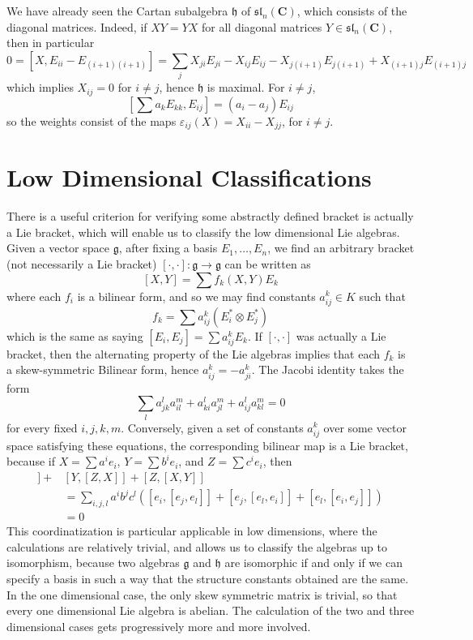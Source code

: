 We have already seen the Cartan subalgebra $\mathfrak{h}$ of $\mathfrak{sl}_n(\mathbf{C})$, which consists of the diagonal matrices. Indeed, if $XY = YX$ for all diagonal matrices $Y \in \mathfrak{sl}_n(\mathbf{C})$, then in particular
%
\[ 0 = [X,E_{ii} - E_{(i+1)(i+1)}] = \sum_j X_{ji} E_{ji} - X_{ij} E_{ij} - X_{j(i+1)} E_{j(i+1)} + X_{(i+1)j} E_{(i+1)j} \]
%
which implies $X_{ij} = 0$ for $i \neq j$, hence $\mathfrak{h}$ is maximal. For $i \neq j$,
%
\[ \left[\sum a_k E_{kk} ,E_{ij} \right] = (a_i - a_j) E_{ij} \]
%
so the weights consist of the maps $\varepsilon_{ij}(X) = X_{ii} - X_{jj}$, for $i \ne j$.















\section{Low Dimensional Classifications}

There is a useful criterion for verifying some abstractly defined bracket is actually a Lie bracket, which will enable us to classify the low dimensional Lie algebras. Given a vector space $\mathfrak{g}$, after fixing a basis $E_1, \dots, E_n$, we find an arbitrary bracket (not necessarily a Lie bracket) $[\cdot, \cdot]: \mathfrak{g} \to \mathfrak{g}$ can be written as
%
\[ [X,Y] = \sum f_k(X,Y) E_k \]
%
where each $f_i$ is a bilinear form, and so we may find constants $a_{ij}^k \in K$ such that
%
\[ f_k = \sum a^k_{ij} ( E_i^* \otimes E_j^* ) \]
%
which is the same as saying $[E_i, E_j] = \sum a_{ij}^k E_k$. If $[\cdot, \cdot]$ was actually a Lie bracket, then the alternating property of the Lie algebras implies that each $f_k$ is a skew-symmetric Bilinear form, hence $a_{ij}^k = -a_{ji}^k$. The Jacobi identity takes the form
%
\[ \sum_l a_{jk}^l a_{il}^m + a_{ki}^l a_{jl}^m + a_{ij}^l a_{kl}^m = 0 \]
%
for every fixed $i,j,k,m$. Conversely, given a set of constants $a^k_{ij}$ over some vector space satisfying these equations, the corresponding bilinear map is a Lie bracket, because if $X = \sum a^i e_i$, $Y = \sum b^i e_i$, and $Z = \sum c^i e_i$, then
%
\begin{align*}
    [X,[Y,Z]] + &[Y,[Z,X]] + [Z,[X,Y]]\\
    &= \sum_{i,j,l} a^i b^j c^l \left( [e_i,[e_j,e_l]] + [e_j,[e_l,e_i]] + [e_l,[e_i,e_j]] \right)\\
    &= 0
\end{align*}
%
This coordinatization is particular applicable in low dimensions, where the calculations are relatively trivial, and allows us to classify the algebras up to isomorphism, because two algebras $\mathfrak{g}$ and $\mathfrak{h}$ are isomorphic if and only if we can specify a basis in such a way that the structure constants obtained are the same. In the one dimensional case, the only skew symmetric matrix is trivial, so that every one dimensional Lie algebra is abelian. The calculation of the two and three dimensional cases gets progressively more and more involved.

